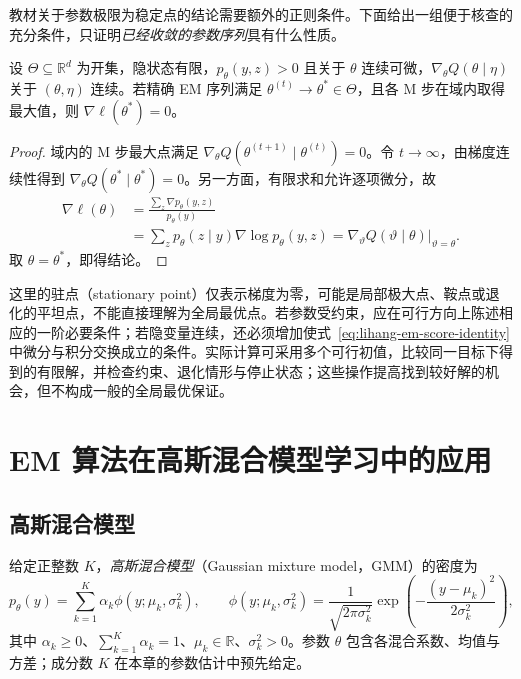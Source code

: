 教材关于参数极限为稳定点的结论需要额外的正则条件。下面给出一组便于核查的充分条件，只证明\emph{已经收敛的参数序列}具有什么性质。

\begin{proposition}[参数极限为驻点的一组充分条件]
\label{prop:lihang-em-stationary-limit}
设 $\Theta\subseteq\mathbb R^d$ 为开集，隐状态有限，$p_\theta(y,z)>0$ 且关于 $\theta$ 连续可微，$\nabla_\theta Q(\theta\mid\eta)$ 关于 $(\theta,\eta)$ 连续。若精确 EM 序列满足 $\theta^{(t)}\to\theta^*\in\Theta$，且各 M 步在域内取得最大值，则 $\nabla\ell(\theta^*)=0$。
\end{proposition}

\begin{proof}
域内的 M 步最大点满足 $\nabla_\theta Q(\theta^{(t+1)}\mid\theta^{(t)})=0$。令 $t\to\infty$，由梯度连续性得到 $\nabla_\theta Q(\theta^*\mid\theta^*)=0$。另一方面，有限求和允许逐项微分，故
\begin{equation}
  \begin{aligned}
    \nabla\ell(\theta)
    &=\frac{\sum_z\nabla p_\theta(y,z)}{p_\theta(y)}\\
    &=\sum_z p_\theta(z\mid y)\nabla\log p_\theta(y,z)
    =\left.\nabla_\vartheta Q(\vartheta\mid\theta)\right|_{\vartheta=\theta}.
  \end{aligned}
  \label{eq:lihang-em-score-identity}
\end{equation}
取 $\theta=\theta^*$，即得结论。
\end{proof}

这里的驻点（stationary point）仅表示梯度为零，可能是局部极大点、鞍点或退化的平坦点，不能直接理解为全局最优点。若参数受约束，应在可行方向上陈述相应的一阶必要条件；若隐变量连续，还必须增加使式~\eqref{eq:lihang-em-score-identity} 中微分与积分交换成立的条件。实际计算可采用多个可行初值，比较同一目标下得到的有限解，并检查约束、退化情形与停止状态；这些操作提高找到较好解的机会，但不构成一般的全局最优保证。

\section{EM 算法在高斯混合模型学习中的应用}
\label{sec:lihang-em-gmm}

\subsection{高斯混合模型}
\label{subsec:lihang-em-gmm-model}

\begin{definition}[一维高斯混合模型]
\label{def:lihang-em-gmm}
给定正整数 $K$，\emph{高斯混合模型}（Gaussian mixture model，GMM）的密度为
\begin{equation}
  p_\theta(y)=\sum_{k=1}^K\alpha_k\phi(y;\mu_k,\sigma_k^2),\qquad
  \phi(y;\mu_k,\sigma_k^2)
  =\frac1{\sqrt{2\pi\sigma_k^2}}
   \exp\left(-\frac{(y-\mu_k)^2}{2\sigma_k^2}\right),
  \label{eq:lihang-em-gmm-density}
\end{equation}
其中 $\alpha_k\geq0$、$\sum_{k=1}^K\alpha_k=1$、$\mu_k\in\mathbb R$、$\sigma_k^2>0$。参数 $\theta$ 包含各混合系数、均值与方差；成分数 $K$ 在本章的参数估计中预先给定。
\end{definition}


